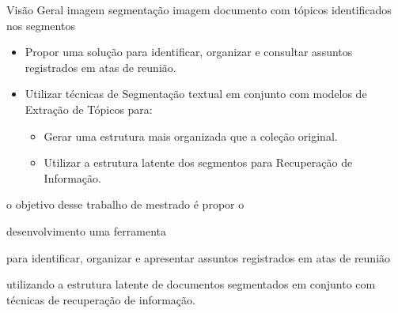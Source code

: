Visão Geral 
imagem segmentação 
imagem documento com tópicos identificados nos segmentos








\begin{itemize}
	\item Propor uma solução para identificar, organizar e consultar assuntos registrados em atas de reunião.  
	\item Utilizar técnicas de Segmentação textual em conjunto com modelos de Extração de Tópicos para:
			\begin{itemize}
	\item Gerar uma estrutura mais organizada que a coleção original.
	\item Utilizar a estrutura latente dos segmentos para Recuperação de Informação. 
		\end{itemize}
\end{itemize}










o objetivo desse trabalho de mestrado é propor o 





desenvolvimento uma ferramenta 


para identificar, organizar e apresentar assuntos registrados em atas de reunião 


utilizando a estrutura latente de documentos segmentados em conjunto com técnicas de recuperação de informação.











